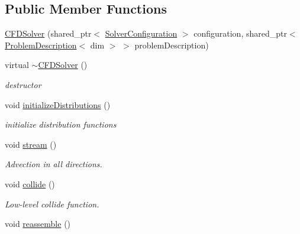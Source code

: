 \subsection*{Public Member Functions}
\begin{DoxyCompactItemize}
\item 
\hyperlink{classnatrium_1_1CFDSolver_a2a459e7f9d5feb0d216f869812723af2}{C\-F\-D\-Solver} (shared\-\_\-ptr$<$ \hyperlink{classnatrium_1_1SolverConfiguration}{Solver\-Configuration} $>$ configuration, shared\-\_\-ptr$<$ \hyperlink{classnatrium_1_1ProblemDescription}{Problem\-Description}$<$ dim $>$ $>$ problem\-Description)
\item 
\hypertarget{classnatrium_1_1CFDSolver_a7ca9bd709255ac87b34f869c984b913b}{virtual \hyperlink{classnatrium_1_1CFDSolver_a7ca9bd709255ac87b34f869c984b913b}{$\sim$\-C\-F\-D\-Solver} ()}\label{classnatrium_1_1CFDSolver_a7ca9bd709255ac87b34f869c984b913b}

\begin{DoxyCompactList}\small\item\em destructor \end{DoxyCompactList}\item 
\hypertarget{classnatrium_1_1CFDSolver_abe627b0bbde0635abb30b9bea4c72dc1}{void \hyperlink{classnatrium_1_1CFDSolver_abe627b0bbde0635abb30b9bea4c72dc1}{initialize\-Distributions} ()}\label{classnatrium_1_1CFDSolver_abe627b0bbde0635abb30b9bea4c72dc1}

\begin{DoxyCompactList}\small\item\em initialize distribution functions \end{DoxyCompactList}\item 
\hypertarget{classnatrium_1_1CFDSolver_ac32a318e504b31195eb61c2cdc2659fe}{void \hyperlink{classnatrium_1_1CFDSolver_ac32a318e504b31195eb61c2cdc2659fe}{stream} ()}\label{classnatrium_1_1CFDSolver_ac32a318e504b31195eb61c2cdc2659fe}

\begin{DoxyCompactList}\small\item\em Advection in all directions. \end{DoxyCompactList}\item 
\hypertarget{classnatrium_1_1CFDSolver_ac9bec7d0c4bcd5e02c5213ec09438c02}{void \hyperlink{classnatrium_1_1CFDSolver_ac9bec7d0c4bcd5e02c5213ec09438c02}{collide} ()}\label{classnatrium_1_1CFDSolver_ac9bec7d0c4bcd5e02c5213ec09438c02}

\begin{DoxyCompactList}\small\item\em Low-\/level collide function. \end{DoxyCompactList}\item 
\hypertarget{classnatrium_1_1CFDSolver_a604212a1f6cd2549b8f60ab26b14de00}{void \hyperlink{classnatrium_1_1CFDSolver_a604212a1f6cd2549b8f60ab26b14de00}{reassemble} ()}\label{classnatrium_1_1CFDSolver_a604212a1f6cd2549b8f60ab26b14de00}


\end{DoxyCompactItemize}
